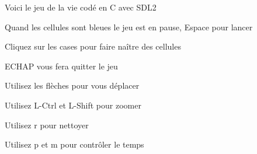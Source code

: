 Voici le jeu de la vie codé en C avec SDL2

Quand les cellules sont bleues le jeu est en pause, Espace pour lancer

Cliquez sur les cases pour faire naître des cellules

ECHAP vous fera quitter le jeu

Utilisez les flèches pour vous déplacer

Utilisez L-\/\+Ctrl et L-\/\+Shift pour zoomer

Utilisez r pour nettoyer

Utilisez p et m pour contrôler le temps 